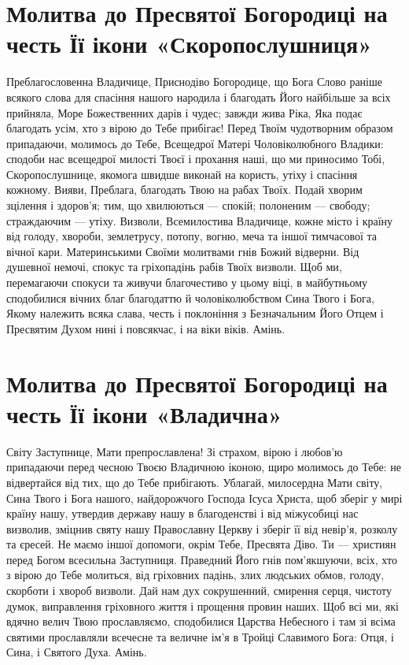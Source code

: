 \documentclass[chapters.tex]{subfiles}
\begin{document}
\section{Молитва до Пресвятої Богородиці на честь Її ікони «Скоропослушниця»}
Преблагословенна Владичице, Приснодіво Богородице, що Бога Слово раніше всякого слова для спасіння нашого народила і благодать Його найбільше за всіх прийняла, Море Божественних дарів і чудес; завжди жива Ріка, Яка подає благодать усім, хто з вірою до Тебе прибігає! Перед Твоїм чудотворним образом припадаючи, молимось до Тебе, Всещедрої Матері Чоловіколюбного Владики: сподоби нас всещедрої милості Твоєї і прохання наші, що ми приносимо Тобі, Скоропослушнице, якомога швидше виконай на користь, утіху і спасіння кожному. Вияви, Преблага, благодать Твою на рабах Твоїх. Подай хворим зцілення і здоров’я; тим, що хвилюються — спокій; полоненим — свободу; страждаючим — утіху. Визволи, Всемилостива Владичице, кожне місто і країну від голоду, хвороби, землетрусу, потопу, вогню, меча та іншої тимчасової та вічної кари. Материнськими Своїми молитвами гнів Божий відверни. Від душевної немочі, спокус та гріхопадінь рабів Твоїх визволи. Щоб ми, перемагаючи спокуси та живучи благочестиво у цьому віці, в майбутньому сподобилися вічних благ благодаттю й чоловіколюбством Сина Твого і Бога, Якому належить всяка слава, честь і поклоніння з Безначальним Його Отцем і Пресвятим Духом нині і повсякчас, і на віки віків. Амінь.

\section{Молитва до Пресвятої Богородиці на честь Її ікони «Владична»}
Світу Заступнице, Мати препрославлена! Зі страхом, вірою і любов’ю припадаючи перед чесною Твоєю Владичною іконою, щиро молимось до Тебе: не відвертайся від тих, що до Тебе прибігають. Ублагай, милосердна Мати світу, Сина Твого і Бога нашого, найдорожчого Господа Ісуса Христа, щоб зберіг у мирі країну нашу, утвердив державу нашу в благоденстві і від міжусобиці нас визволив, зміцнив святу нашу Православну Церкву і зберіг її від невір’я, розколу та єресей. Не маємо іншої допомоги, окрім Тебе, Пресвята Діво. Ти — християн перед Богом всесильна Заступниця. Праведний Його гнів пом’якшуючи, всіх, хто з вірою до Тебе молиться, від гріховних падінь, злих людських обмов, голоду, скорботи і хвороб визволи. Дай нам дух сокрушенний, смирення серця, чистоту думок, виправлення гріховного життя і прощення провин наших. Щоб всі ми, які вдячно велич Твою прославляємо, сподобилися Царства Небесного і там зі всіма святими прославляли всечесне та величне ім’я в Тройці Славимого Бога: Отця, і Сина, і Святого Духа. Амінь.
\end{document}
